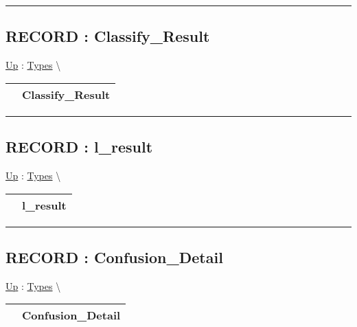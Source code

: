 \par


\rule{\linewidth}{0.5pt}
\subsection*{RECORD : Classify\_Result}
\hypertarget{ecldoc:ml_core.types.classify_result}{}
\hyperlink{ecldoc:ML_Core.Types}{Up} :
\hspace{0pt} \hyperlink{ecldoc:ML_Core.Types}{Types} \textbackslash 

{\renewcommand{\arraystretch}{1.5}
\begin{tabularx}{\textwidth}{|>{\raggedright\arraybackslash}l|X|}
\hline
\hspace{0pt} & Classify\_Result \\
\hline
\end{tabularx}
}

\par


\rule{\linewidth}{0.5pt}
\subsection*{RECORD : l\_result}
\hypertarget{ecldoc:ml_core.types.l_result}{}
\hyperlink{ecldoc:ML_Core.Types}{Up} :
\hspace{0pt} \hyperlink{ecldoc:ML_Core.Types}{Types} \textbackslash 

{\renewcommand{\arraystretch}{1.5}
\begin{tabularx}{\textwidth}{|>{\raggedright\arraybackslash}l|X|}
\hline
\hspace{0pt} & l\_result \\
\hline
\end{tabularx}
}

\par


\rule{\linewidth}{0.5pt}
\subsection*{RECORD : Confusion\_Detail}
\hypertarget{ecldoc:ml_core.types.confusion_detail}{}
\hyperlink{ecldoc:ML_Core.Types}{Up} :
\hspace{0pt} \hyperlink{ecldoc:ML_Core.Types}{Types} \textbackslash 

{\renewcommand{\arraystretch}{1.5}
\begin{tabularx}{\textwidth}{|>{\raggedright\arraybackslash}l|X|}
\hline
\hspace{0pt} & Confusion\_Detail \\
\hline
\end{tabularx}
}

